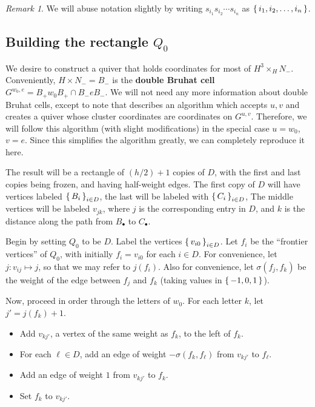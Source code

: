 \documentclass{amsart}
\theoremstyle{plain}
\theoremstyle{definition}
\theoremstyle{remark}
\newtheorem{remark}[theorem]{Remark}
\newcommand{\defined}[1]{\textbf{#1}}
\begin{document}
  \begin{remark}
    We will abuse notation slightly by writing $s_{i_1} s_{i_2} \dotsb
    s_{i_n}$ as $\set{i_1, i_2, \dotsc, i_n}$.
  \end{remark}

  \subsection{Building the rectangle \texorpdfstring{$Q_0$}{Q0}}

  \label{sec:Q0-construction}

  We desire to construct a quiver that holds coordinates for most of
  $H^3 \times_H N_{-}$. Conveniently, $H \times N_{-} = B_{-}$ is the
  \defined{double Bruhat cell} $G^{w_0,e} = B_{+} w_0 B_{+} \cap B_{-} e
  B_{-}$. We will not need any more information about double Bruhat
  cells, except to note that \cite[Section~2]{fominzelevinsky2005}
  describes an algorithm which accepts $u, v$ and creates a quiver whose
  cluster coordinates are coordinates on $G^{u,v}$. Therefore, we will
  follow this algorithm (with slight modifications) in the special case
  $u = w_0$, $v = e$. Since this simplifies the algorithm greatly, we
  can completely reproduce it here.

  The result will be a rectangle of $(h/2) + 1$ copies of $D$, with the
  first and last copies being frozen, and having half-weight edges. The
  first copy of $D$ will have vertices labeled $\set{B_{i}}_{i \in D}$,
  the last will be labeled with $\set{C_{i}}_{i \in D}$, The middle
  vertices will be labeled $v_{jk}$, where $j$ is the corresponding
  entry in $D$, and $k$ is the distance along the path from
  $B_{\bullet}$ to $C_{\bullet}$.

  Begin by setting $Q_0$ to be $D$. Label the vertices $\set{v_{i0}}_{i
    \in D}$. Let $f_i$ be the ``frontier vertices'' of $Q_0$, with
  initially $f_i = v_{i0}$ for each $i \in D$. For convenience, let $j :
  v_{ij} \mapsto j$, so that we may refer to $j(f_i)$. Also for
  convenience, let $\sigma(f_j, f_k)$ be the weight of the edge between
  $f_j$ and $f_k$ (taking values in $\set{-1, 0, 1}$).

  Now, proceed in order through the letters of $w_0$. For each letter
  $k$, let $j' = j(f_k) + 1$.
  \begin{itemize}
  \item
    Add $v_{kj'}$, a vertex of the same weight as $f_k$, to the left of
    $f_k$.
  \item
    For each $\ell \in D$, add an edge of weight $-\sigma(f_k,
    f_{\ell})$ from $v_{kj'}$ to $f_{\ell}$.
  \item
    Add an edge of weight $1$ from $v_{kj'}$ to $f_k$.
  \item
    Set $f_k$ to $v_{kj'}$.
  \end{itemize}
\end{document}
